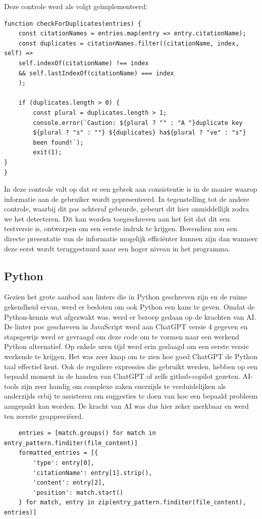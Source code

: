 \begin{minipage}{\pdfpagewidth}
Deze controle werd als volgt geïmplementeerd:

\begin{verbatim}
function checkForDuplicates(entries) {
    const citationNames = entries.map(entry => entry.citationName);
    const duplicates = citationNames.filter((citationName, index, self) => 
    self.indexOf(citationName) !== index 
    && self.lastIndexOf(citationName) === index
    );

    if (duplicates.length > 0) {
        const plural = duplicates.length > 1;
        console.error(`Caution: ${plural ? "" : "A "}duplicate key
        ${plural ? "s" : ""} ${duplicates} ha${plural ? "ve" : "s"} 
        been found!`);
        exit(1);
}
}
\end{verbatim}
\end{minipage}
In deze controle valt op dat er een gebrek aan consistentie is in de manier waarop informatie aan de gebruiker wordt gepresenteerd. In tegenstelling tot de andere controle, waarbij dit pas achteraf gebeurde, gebeurt dit hier onmiddellijk zodra we het detecteren. Dit kan worden toegeschreven aan het feit dat dit een testversie is, ontworpen om een eerste indruk te krijgen. Bovendien zou een directe presentatie van de informatie mogelijk efficiënter kunnen zijn dan wanneer deze eerst wordt teruggestuurd naar een hoger niveau in het programma.

\subsection{Python}
\label{subsec:python}
Gezien het grote aanbod aan linters die in Python geschreven zijn en de ruime gekendheid ervan, werd er besloten om ook Python een kans te geven. Omdat de Python-kennis wat afgezwakt was, werd er beroep gedaan op de krachten van AI. De linter poc geschreven in JavaScript werd aan ChatGPT versie 4 gegeven en stapsgewijs werd er gevraagd om deze code om te vormen naar een werkend Python alternatief. Op enkele uren tijd werd erin geslaagd om een eerste versie werkende te krijgen. Het was zeer knap om te zien hoe goed ChatGPT de Python taal effectief kent. Ook de reguliere expressies die gebruikt werden, hebben op een bepaald moment in de handen van ChatGPT of zelfs github-copilot gezeten. AI-tools zijn zeer handig om complexe zaken enerzijds te verduidelijken als anderzijds erbij te assisteren om suggesties te doen van hoe een bepaald probleem aangepakt kan worden. De kracht van AI was dus hier zeker merkbaar en werd ten zeerste geappreciëerd.
\pagebreak
\begin{verbatim}
    entries = [match.groups() for match in entry_pattern.finditer(file_content)]
    formatted_entries = [{
        'type': entry[0],
        'citationName': entry[1].strip(),
        'content': entry[2],
        'position': match.start()
    } for match, entry in zip(entry_pattern.finditer(file_content), entries)]

\end{verbatim}

